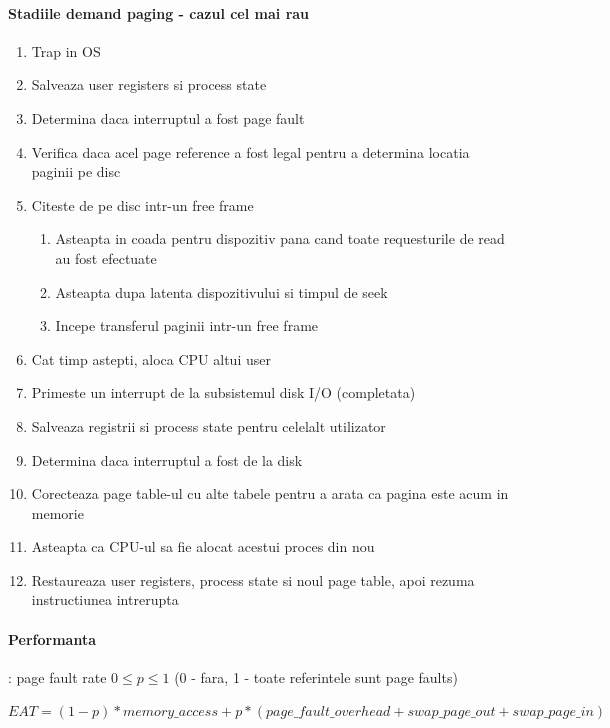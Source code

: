 \documentclass{article}
\begin{document}
\paragraph*{Stadiile demand paging - cazul cel mai rau}
\begin{enumerate}
    \item Trap in OS
    \item Salveaza user registers si process state
    \item Determina daca interruptul a fost page fault
    \item Verifica daca acel page reference a fost legal pentru a determina locatia paginii pe disc
    \item Citeste de pe disc intr-un free frame
          \begin{enumerate}
              \item Asteapta in coada pentru dispozitiv pana cand toate requesturile de read au fost efectuate
              \item Asteapta dupa latenta dispozitivului si timpul de seek
              \item Incepe transferul paginii intr-un free frame
          \end{enumerate}
    \item Cat timp astepti, aloca CPU altui user
    \item Primeste un interrupt de la subsistemul disk I/O (completata)
    \item Salveaza registrii si process state pentru celelalt utilizator
    \item Determina daca interruptul a fost de la disk
    \item Corecteaza page table-ul cu alte tabele pentru a arata ca pagina este acum in memorie
    \item Asteapta ca CPU-ul sa fie alocat acestui proces din nou
    \item Restaureaza user registers, process state si noul page table, apoi rezuma instructiunea intrerupta
\end{enumerate}

\paragraph*{Performanta}: page fault rate $0 \leq p \leq 1$ (0 - fara, 1 - toate referintele sunt page faults)
\begin{center}
    \begin{math}
        EAT = (1-p) * memory\_access + p * (page\_fault\_overhead + swap\_page\_out + swap\_page\_in)
    \end{math}
\end{center}
\end{document}
